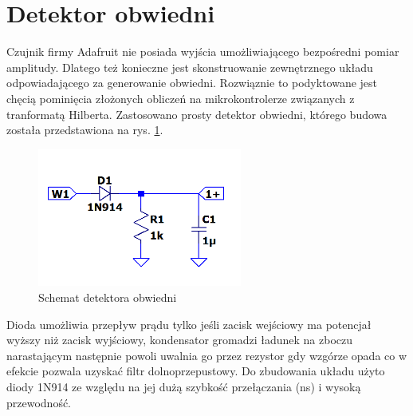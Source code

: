 \documentclass[eng,printmode]{mgr}
\begin{document}
\section{Detektor obwiedni}
Czujnik firmy Adafruit nie posiada wyjścia umożliwiającego bezpośredni pomiar amplitudy. Dlatego też konieczne jest skonstruowanie zewnętrznego układu odpowiadającego za generowanie obwiedni. Rozwiąznie to podyktowane jest chęcią pominięcia złożonych obliczeń na mikrokontrolerze związanych z tranformatą Hilberta. Zastosowano prosty detektor obwiedni, którego budowa została przedstawiona na rys. \ref{fig-generatorobwiedni}.
\begin{figure}

    \centering

  \includegraphics[width=0.6\textwidth, angle=0]{obwiednia.png}

    \caption{Schemat detektora obwiedni \cite{obwiednia}}
\label{fig-generatorobwiedni}

\end{figure}
\newpage
\noindent Dioda umożliwia przepływ prądu tylko jeśli zacisk wejściowy ma potencjał wyższy niż zacisk wyjściowy, kondensator gromadzi ładunek na zboczu narastającym następnie powoli uwalnia go przez rezystor gdy wzgórze opada co w efekcie pozwala uzyskać filtr dolnoprzepustowy. Do zbudowania układu użyto diody 1N914 ze względu na jej dużą szybkość przełączania (\unit[4]{ns}) i wysoką przewodność. 
\end{document}
